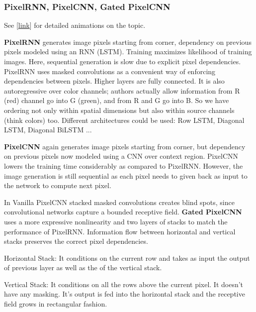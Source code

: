 \documentclass[12pt]{article}
\begin{document}
\subsubsection{PixelRNN, PixelCNN, Gated PixelCNN}
\par See [\href{https://wiki.math.uwaterloo.ca/statwiki/index.php?title=STAT946F17/Conditional_Image_Generation_with_PixelCNN_Decoders}{link}] for detailed animations on the topic.
\par \textbf{PixelRNN} generates image pixels starting from corner, dependency on previous pixels modeled using an RNN (LSTM).  Training maximizes likelihood of training images. Here, sequential generation is slow due to explicit pixel dependencies. PixelRNN uses masked convolutions as a convenient way of enforcing dependencies between pixels. Higher layers are fully connected. It is also autoregressive over color channels; authors actually allow information from R (red) channel go into G (green), and from R and G go into B. So we have ordering not only within spatial dimensions but also within source channels (think colors) too. Different architectures could be used: Row LSTM, Diagonal LSTM, Diagonal BiLSTM ...
\par \textbf{PixelCNN} again generates image pixels starting from corner, but dependency on previous pixels now modeled using a CNN over context region. PixelCNN lowers the training time considerably as compared to PixelRNN. However, the image generation is still sequential as each pixel needs to given back as input to the network to compute next pixel.
\par In Vanilla PixelCNN stacked masked convolutions creates blind spots, since convolutional networks capture a bounded receptive field. \textbf{Gated PixelCNN} uses a more expressive nonlinearity and two layers of stacks to match the performance of PixelRNN. Information flow between horizontal and vertical stacks preserves the correct pixel dependencies.
\ulb
\item Horizontal Stack: It conditions on the current row and takes as input the output of previous layer as well as the of the vertical stack.
\item Vertical Stack: It conditions on all the rows above the current pixel. It doesn’t have any masking. It’s output is fed into the horizontal stack and the receptive field grows in rectangular fashion.
\ule
\end{document}
